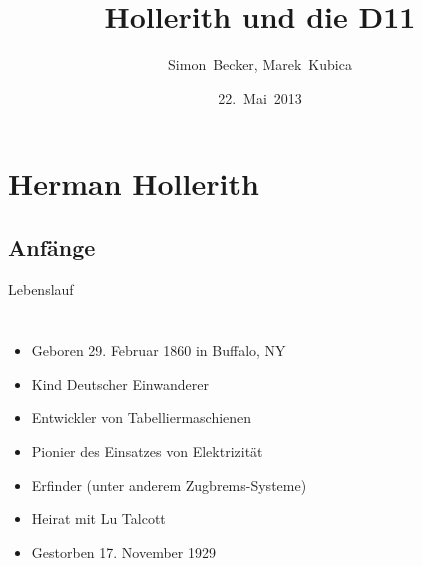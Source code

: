 \documentclass[EU2]{beamer}
\title{Hollerith und die D11}
\author{Simon~Becker, Marek~Kubica}
\date{22.~Mai~2013}
\institute{Technische Universität München}
\begin{document}
\frame{\titlepage}


\frame{\tableofcontents}

\section{Herman Hollerith}

\subsection{Anfänge}

\begin{frame}{Lebenslauf}
  \begin{columns}
    \begin{itemize}
      \item Geboren 29. Februar 1860 in Buffalo, NY
      \item Kind Deutscher Einwanderer
      \item Entwickler von Tabelliermaschienen
      \item Pionier des Einsatzes von Elektrizität
      \item Erfinder (unter anderem Zugbrems-Systeme)
      \item Heirat mit Lu Talcott
      \item Gestorben 17. November 1929
    \end{itemize}

\end{columns}
\end{frame}
\end{document}
